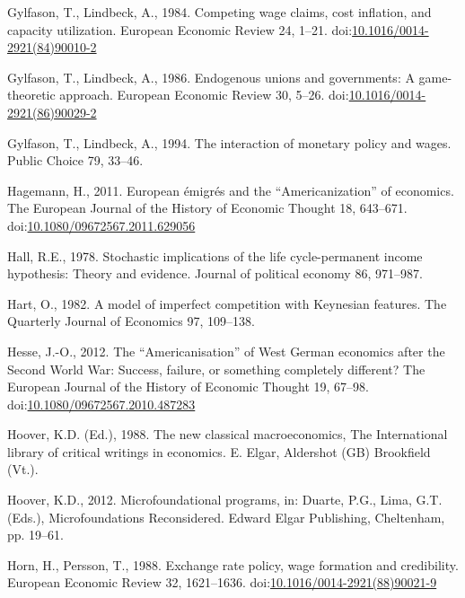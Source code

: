 \documentclass[
  12pt,
  onecolumn]{article}
\newlength{\cslhangindent}
\newlength{\cslentryspacingunit} %
\newenvironment{CSLReferences}[2] %
 {%
  \setlength{\parindent}{0pt}
  \ifodd #1
  \let\oldpar\par
  \def\par{\hangindent=\cslhangindent\oldpar}
  \fi
  \setlength{\parskip}{#2\cslentryspacingunit}
 }%
 {}
\begin{document}
\begin{CSLReferences}{1}{0}
\leavevmode{}%
Gylfason, T., Lindbeck, A., 1984. Competing wage claims, cost inflation,
and capacity utilization. European Economic Review 24, 1--21.
doi:\href{https://doi.org/10.1016/0014-2921(84)90010-2}{10.1016/0014-2921(84)90010-2}

\leavevmode{}%
Gylfason, T., Lindbeck, A., 1986. Endogenous unions and governments: {A}
game-theoretic approach. European Economic Review 30, 5--26.
doi:\href{https://doi.org/10.1016/0014-2921(86)90029-2}{10.1016/0014-2921(86)90029-2}

\leavevmode{}%
Gylfason, T., Lindbeck, A., 1994. The interaction of monetary policy and
wages. Public Choice 79, 33--46.

\leavevmode{}%
Hagemann, H., 2011. European émigrés and the {``{Americanization}''} of
economics. The European Journal of the History of Economic Thought 18,
643--671.
doi:\href{https://doi.org/10.1080/09672567.2011.629056}{10.1080/09672567.2011.629056}

\leavevmode{}%
Hall, R.E., 1978. Stochastic implications of the life cycle-permanent
income hypothesis: Theory and evidence. Journal of political economy 86,
971--987.

\leavevmode{}%
Hart, O., 1982. A model of imperfect competition with {Keynesian}
features. The Quarterly Journal of Economics 97, 109--138.

\leavevmode{}%
Hesse, J.-O., 2012. The {``{Americanisation}''} of {West German}
economics after the {Second World War}: {Success}, failure, or something
completely different? The European Journal of the History of Economic
Thought 19, 67--98.
doi:\href{https://doi.org/10.1080/09672567.2010.487283}{10.1080/09672567.2010.487283}

\leavevmode{}%
Hoover, K.D. (Ed.), 1988. The new classical macroeconomics, The
{International} library of critical writings in economics. E. Elgar,
Aldershot (GB) Brookfield (Vt.).

\leavevmode{}%
Hoover, K.D., 2012. Microfoundational programs, in: Duarte, P.G., Lima,
G.T. (Eds.), Microfoundations {Reconsidered}. Edward Elgar Publishing,
Cheltenham, pp. 19--61.

\leavevmode{}%
Horn, H., Persson, T., 1988. Exchange rate policy, wage formation and
credibility. European Economic Review 32, 1621--1636.
doi:\href{https://doi.org/10.1016/0014-2921(88)90021-9}{10.1016/0014-2921(88)90021-9}


\end{CSLReferences}
\end{document}
